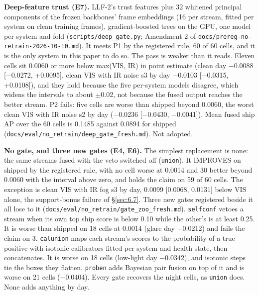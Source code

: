 \documentclass[10pt]{article}
\begin{document}
\textbf{Deep-feature trust (E7).} LLF-2's trust features plus 32 whitened principal components of the frozen backbones' frame embeddings (16 per stream, fitted per system on clean training frames), gradient-boosted trees on the GPU, one model per system and fold (\texttt{scripts/\allowbreak{}deep\_\allowbreak{}gate.py}; Amendment 2 of \texttt{docs/\allowbreak{}prereg-no-retrain-2026-10-10.md}). It meets P1 by the registered rule, 60 of 60 cells, and it is the only system in this paper to do so. The pass is weaker than it reads. Eleven cells sit 0.0060 or more below max(VIS, IR) in point estimate (clean day $-$0.0088 [$-$0.0272, +0.0095], clean VIS with IR noise s3 by day $-$0.0103 [$-$0.0315, +0.0108]), and they hold because the five per-system models disagree, which widens the intervals to about $\pm$0.02, not because the fused output reaches the better stream. P2 fails: five cells are worse than shipped beyond 0.0060, the worst clean VIS with IR noise s2 by day ($-$0.0236 [$-$0.0430, $-$0.0041]). Mean fused ship AP over the 60 cells is 0.1485 against 0.0894 for shipped (\texttt{docs/\allowbreak{}eval/\allowbreak{}no\_\allowbreak{}retrain/\allowbreak{}deep\_\allowbreak{}gate\_\allowbreak{}fresh.md}). Not adopted.

\textbf{No gate, and three new gates (E4, E6).} The simplest replacement is none: the same streams fused with the veto switched off (\texttt{union}). It IMPROVES on shipped by the registered rule, with no cell worse at 0.0014 and 30 better beyond 0.0060 with the interval above zero, and holds the claim on 59 of 60 cells. The exception is clean VIS with IR fog s3 by day, 0.0099 [0.0068, 0.0131] below VIS alone, the support-bonus failure of \S\ref{sec:6.7}. Three new gates registered beside it all lose to it (\texttt{docs/\allowbreak{}eval/\allowbreak{}no\_\allowbreak{}retrain/\allowbreak{}gate\_\allowbreak{}zoo\_\allowbreak{}fresh.md}). \texttt{selfconf} vetoes a stream when its own top ship score is below 0.10 while the other's is at least 0.25. It is worse than shipped on 18 cells at 0.0014 (glare day $-$0.0212) and fails the claim on 3. \texttt{calunion} maps each stream's scores to the probability of a true positive with isotonic calibrators fitted per system and health state, then concatenates. It is worse on 18 cells (low-light day $-$0.0342), and isotonic steps tie the boxes they flatten. \texttt{proben} adds Bayesian pair fusion \citep{chen2022multimodal} on top of it and is worse on 21 cells ($-$0.0404). Every gate recovers the night cells, as \texttt{union} does. None adds anything by day.
\end{document}

